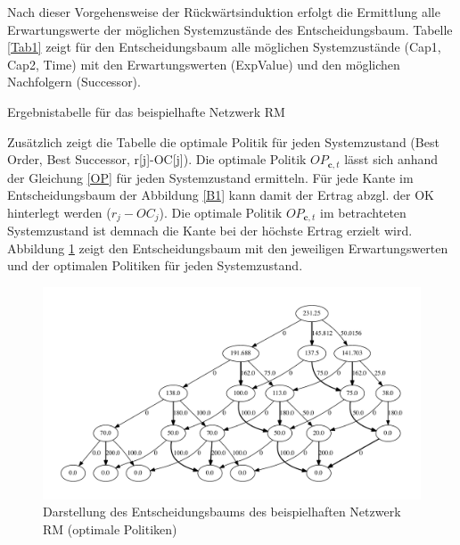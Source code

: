 Nach dieser Vorgehensweise der Rückwärtsinduktion erfolgt die Ermittlung alle Erwartungswerte der möglichen Systemzustände des Entscheidungsbaum. Tabelle \ref{Tab1} zeigt für den Entscheidungsbaum alle möglichen Systemzustände (Cap1, Cap2, Time) mit den Erwartungswerten (ExpValue) und den möglichen Nachfolgern (Successor).
\begin{table}
\begin{footnotesize}
    \caption{Ergebnistabelle für das beispielhafte Netzwerk RM} \label{Tab1}
    \vspace*{3mm}
\end{footnotesize}
\end{table}

Zusätzlich zeigt die Tabelle die optimale Politik für jeden Systemzustand (Best Order, Best Successor, r[j]-OC[j]). Die optimale Politik $OP_{\textbf{c}, t}$ lässt sich anhand der Gleichung \eqref{OP} für jeden Systemzustand ermitteln. Für jede Kante im Entscheidungsbaum der Abbildung \ref{B1} kann damit der Ertrag abzgl. der OK hinterlegt werden ($r_{j}-OC_{j}$). Die optimale Politik $OP_{\textbf{c}, t}$ im betrachteten Systemzustand ist demnach die Kante bei der höchste Ertrag erzielt wird. Abbildung \ref{B1a} zeigt den Entscheidungsbaum mit den jeweiligen Erwartungswerten und der optimalen Politiken für jeden Systemzustand.
\begin{figure}[h!]
  \begin{center}
    \includegraphics[width=150mm]{Bilder/Beispiel1a.pdf}
    \caption{Darstellung des Entscheidungsbaums des beispielhaften Netzwerk RM (optimale Politiken)}  \label{B1a}
  \end{center}
\end{figure}

